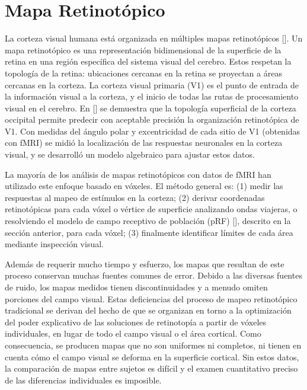 \section{Mapa Retinotópico}

La corteza visual humana está organizada en múltiples mapas retinotópicos [\cite{wandell_computational_2015}]. Un mapa retinotópico es una representación bidimensional de la superficie de la retina en una región específica del sistema visual del cerebro. Estos respetan la topología de la retina: ubicaciones cercanas en la retina se proyectan a áreas cercanas en la corteza. La corteza visual primaria (V1) es el punto de entrada de la información visual a la corteza, y el inicio de todas las rutas de procesamiento visual en el cerebro. En [\cite{benson_retinotopic_2012}] se demuestra que la topología superficial de la corteza occipital permite predecir con aceptable precisión la organización retinotópica de V1. Con medidas del ángulo polar y excentricidad de cada sitio de V1 (obtenidas con fMRI) se midió la localización de las respuestas neuronales en la corteza visual, y se desarrolló un modelo algebraico para ajustar estos datos. 

La mayoría de los análisis de mapas retinotópicos con datos de fMRI han utilizado este enfoque basado en vóxeles. El método general es: (1) medir las respuestas al mapeo de estímulos en la corteza; (2) derivar coordenadas retinotópicas para cada vóxel o vértice de superficie analizando ondas viajeras, o resolviendo el modelo de campo receptivo de población (pRF) [\cite{dumoulin_population_2008}], descrito en la sección anterior, para cada vóxel; (3) finalmente identificar límites de cada área mediante inspección visual.

Además de requerir mucho tiempo y esfuerzo, los mapas que resultan de este proceso conservan muchas fuentes comunes de error. Debido a las diversas fuentes de ruido, los mapas medidos tienen discontinuidades y a menudo omiten porciones del campo visual. Estas deficiencias del proceso de mapeo retinotópico tradicional se derivan del hecho de que se organizan en torno a la optimización del poder explicativo de las soluciones de retinotopía a partir de vóxeles individuales, en lugar de todo el campo visual o el área cortical. Como consecuencia, se producen mapas que no son uniformes ni completos, ni tienen en cuenta cómo el campo visual se deforma en la superficie cortical. Sin estos datos, la comparación de mapas entre sujetos es difícil y el examen cuantitativo preciso de las diferencias individuales es imposible.

